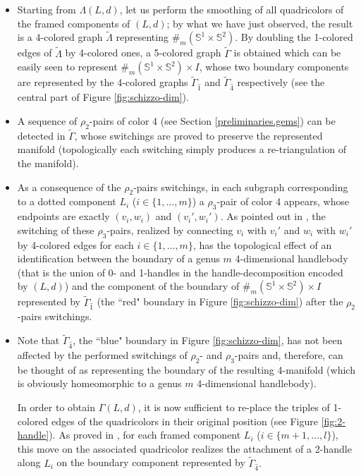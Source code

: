 \documentclass[12pt,a4paper]{article}
\newcommand{\qed}{\\ \rightline{$\Box$ \ \ \ \ \ \ \ \ \ \ \ \ \ \ \ }\\}
\newcommand{\G}{\Gamma}
\begin{document}
\begin{itemize}
    \item Starting from $\Lambda(L,d)$, let us perform the smoothing of all quadricolors of the framed components of $(L,d)$; by what we have just observed, the result is a 4-colored graph $\tilde\Lambda$ representing $\#_m (\mathbb S^1\times\mathbb S^2).$ 
By doubling the 1-colored edges of $\tilde\Lambda$ by 4-colored ones, a 5-colored graph $\tilde\G$ is obtained which can be easily seen to represent $\#_m (\mathbb S^1\times\mathbb S^2)\times I$, whose two boundary components are represented by the 4-colored graphs $\tilde\G_{\hat 1}$ and $\tilde\G_{\hat 4}$ respectively (see the central part of Figure \ref{fig:schizzo-dim}).

\item  
A sequence of $\rho_2$-pairs of color 4 (see Section \ref{preliminaries.gems}) can be detected in $\tilde\G$, whose switchings are proved to preserve the represented manifold (topologically each switching simply produces a re-triangulation of the manifold). 

\item As a consequence of the $\rho_2$-pairs switchings, in each subgraph corresponding to a dotted component $L_i$ ($i\in\{1,\ldots,m\}$) a $\rho_3$-pair of color 4 appears, whose endpoints are exactly $(v_i,w_i)$ and $(v_i',w_i')$.
As pointed out in \cite[Proposition 11]{Casali-Cristofori Kirby-diagrams}, the switching of these $\rho_3$-pairs, realized by connecting $v_i$ with $v_i'$ and $w_i$ with $w_i'$ by 4-colored edges for each $i\in\{1,\ldots,m\}$, has the topological effect of an identification between the boundary of a genus $m$ 4-dimensional handlebody (that is the union of 0- and 1-handles in the handle-decomposition encoded by $(L,d)$) and the component of the boundary of $\#_m (\mathbb S^1\times\mathbb S^2)\times I$ represented by $\tilde\G_{\hat 1}$ (the ``red" boundary in Figure \ref{fig:schizzo-dim}) after the $\rho_2$-pairs switchings.  

\item  Note that $\tilde\G_{\hat 4}$, the ``blue" boundary in Figure \ref{fig:schizzo-dim}, has not been affected by the performed switchings of $\rho_2$- and $\rho_3$-pairs and, therefore, can be thought of as representing the boundary of the resulting 4-manifold (which is obviously homeomorphic to a genus $m$ 4-dimensional handlebody). 

\noindent In order to obtain $\G(L,d)$, it is now sufficient to re-place the triples of 1-colored edges of the quadricolors in their original position (see Figure \ref{fig:2-handle}). 
As proved in \cite[Proposition 9(ii)]{Casali-Cristofori Kirby-diagrams}, for each framed component $L_i$ ($i\in\{m+1,\ldots,l\}$), this move on the associated quadricolor realizes the attachment of a 2-handle along $L_i$ on the boundary component represented by $\tilde\G_{\hat 4}.$
\end{itemize}
\ \qed
\end{document}
